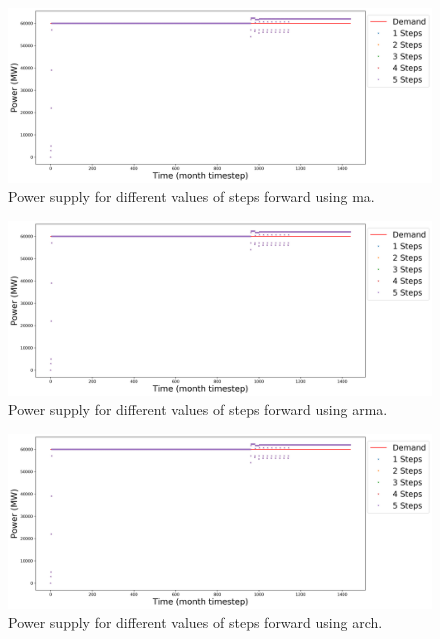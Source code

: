\documentclass[11pt]{article}
\begin{document}
\begin{figure}[H]
	\centering
	\includegraphics[width=\textwidth]{23-figures/23-power-buffer0-ma-steps.png} 
	\hfill
	\caption{Power supply for different values of steps forward using ma.}
	\label{fig:23-ste-ma}
\end{figure}

\begin{figure}[H]
	\centering
	\includegraphics[width=\textwidth]{23-figures/23-power-buffer0-arma-steps.png} 
	\hfill
	\caption{Power supply for different values of steps forward using arma.}
	\label{fig:23-ste-arma}
\end{figure}

\begin{figure}[H]
	\centering
	\includegraphics[width=\textwidth]{23-figures/23-power-buffer0-arch-steps.png} 
	\hfill
	\caption{Power supply for different values of steps forward using arch.}
	\label{fig:23-ste-arch}
\end{figure}
\end{document}

